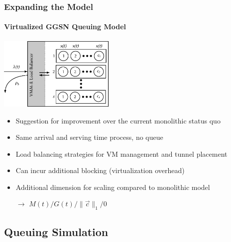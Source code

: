 \documentclass{beamer}
\begin{document}
\begin{frame}
	\frametitle{Expanding the Model}
	\framesubtitle{Virtualized GGSN Queuing Model}
		\begin{center}
			\includegraphics[height=3.5cm]{extras/ggsn-virtualized.pdf}
		\end{center}

		\begin{itemize}
			\item Suggestion for improvement over the current monolithic status quo
			\item Same arrival and serving time process, no queue
			\item Load balancing strategies for VM management and tunnel placement
			\item Can incur additional blocking (virtualization overhead)
			\item Additional dimension for scaling compared to monolithic model
			\item[$\rightarrow$] $M(t)/G(t)/\|\overrightarrow{c}\|_1/0$ %
		\end{itemize}
\end{frame}


\subsection{Queuing Simulation}
\end{document}
